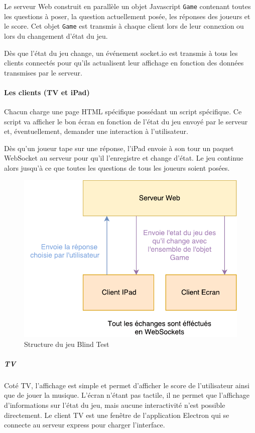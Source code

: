 Le serveur Web construit en parallèle un objet Javascript \texttt{Game} contenant toutes les questions à poser, la question actuellement posée, les réponses des joueurs et le score.
Cet objet \texttt{Game} est transmis à chaque client lors de leur connexion ou lors du changement d'état du jeu.

Dès que l'état du jeu change, un événement socket.io est transmis à tous les clients connectés pour qu'ils actualisent leur affichage en fonction des données transmises par le serveur.

\paragraph{Les clients (TV et iPad)} Chacun charge une page HTML spécifique possédant un script spécifique.
Ce script va afficher le bon écran en fonction de l'état du jeu envoyé par le serveur et, éventuellement, demander une interaction à l'utilisateur.

Dès qu'un joueur tape sur une réponse, l'iPad envoie à son tour un paquet WebSocket au serveur pour qu'il l'enregistre et change d'état.
Le jeu continue alors jusqu'à ce que toutes les questions de tous les joueurs soient posées.

\begin{figure}[h]
    \centering
    \includegraphics{img/ah-blindtest.pdf}
    \caption{Structure du jeu Blind Test}
\end{figure}

\subparagraph{TV} Coté TV, l'affichage est simple et permet d'afficher le score de l'utilisateur ainsi que de jouer la musique.
L'écran n'étant pas tactile, il ne permet que l'affichage d'informations sur l'état du jeu, mais aucune interactivité n'est possible directement.
Le client TV est une fenêtre de l'application Electron qui se connecte au serveur express pour charger l'interface.

